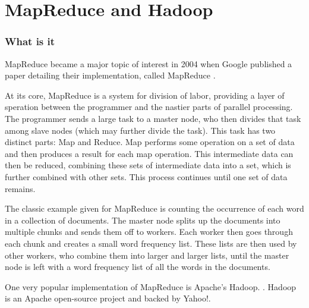 \documentclass[conference, compsocconf, letterpaper]{IEEEtran}
\begin{document}



\section{MapReduce and Hadoop}

\subsubsection{What is it}

MapReduce became a major topic of interest in 2004 when Google published a paper detailing their implementation, called MapReduce \cite{mapreduce}.

At its core, MapReduce \cite{mapreduce} is a system for division of labor, providing a layer of speration between the programmer and the nastier parts of parallel processing.  The programmer sends a large task to a master node, who then divides that task among slave nodes (which may further divide the task).  This task has two distinct parts: Map and Reduce.  Map performs some operation on a set of data and then produces a result for each map operation.  This intermediate data can then be reduced, combining these sets of intermediate data into a set, which is further combined with other sets.  This process continues until one set of data remains.

The classic example given for MapReduce is counting the occurrence of each word in a collection of documents.  The master node splits up the documents into multiple chunks and sends them off to workers.  Each worker then goes through each chunk and creates a small word frequency list.  These lists are then used by other workers, who combine them into larger and larger lists, until the master node is left with a word frequency list of all the words in the documents. 


One very popular implementation of MapReduce is Apache's Hadoop. \cite{Hadoop}.  Hadoop is an Apache open-source project and backed by Yahoo!. 
\end{document}
